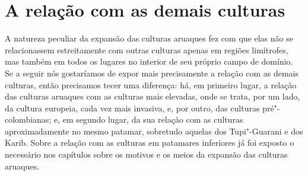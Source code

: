 \chapter*{A relação com as demais culturas\smallskip{}}

A natureza peculiar da expansão das culturas aruaques fez com que elas
não se relacionassem estreitamente com outras culturas apenas em regiões
limítrofes, mas também em todos os lugares no interior de seu próprio
campo de domínio. Se a seguir nós gostaríamos de expor mais
precisamente a relação com as demais culturas, então precisamos tecer
uma diferença: há, em primeiro lugar, a relação das culturas aruaques com
as culturas mais elevadas, onde se trata, por um lado, da cultura
europeia, cada vez mais invasiva, e, por outro, das culturas
pré"-colombianas; e, em segundo lugar, da sua relação com as culturas
aproximadamente no mesmo patamar, sobretudo aquelas dos Tupi"-Guarani e
dos Karib. Sobre a relação com as culturas em patamares inferiores já
foi exposto o necessário nos capítulos sobre os motivos e os meios da
expansão das culturas aruaques.

